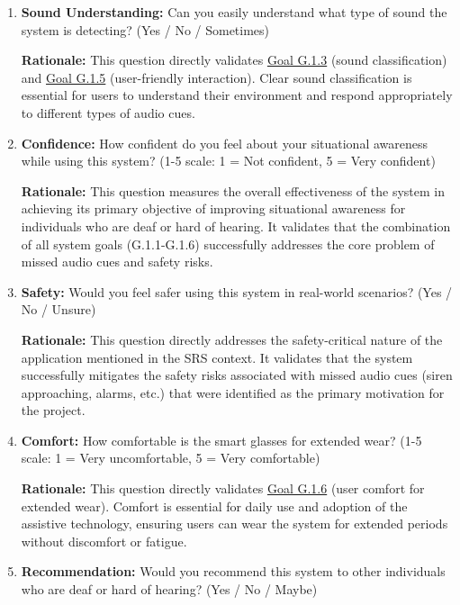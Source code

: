 \documentclass[12pt, titlepage]{article}
\begin{document}
\begin{enumerate}
    \item \textbf{Sound Understanding:} Can you easily understand what type of
    sound the system is detecting? (Yes / No / Sometimes)
    
    \textbf{Rationale:} This question directly validates
    \hyperref[SRS-goal:audio_identification_analysis]{Goal G.1.3} (sound
    classification) and
    \hyperref[SRS-goal:user_friendly_interaction]{Goal G.1.5}
    (user-friendly interaction). Clear sound classification is essential for
    users to understand their environment and respond appropriately to different
    types of audio cues.
    
    \item \textbf{Confidence:} How confident do you feel about your situational
    awareness while using this system? (1-5 scale: 1 = Not confident, 5 = Very
    confident)
    
    \textbf{Rationale:} This question measures the overall effectiveness of the
    system in achieving its primary objective of improving situational awareness
    for individuals who are deaf or hard of hearing. It validates that the
    combination of all system goals (G.1.1-G.1.6) successfully addresses the
    core problem of missed audio cues and safety risks.
    
    \item \textbf{Safety:} Would you feel safer using this system in real-world
    scenarios? (Yes / No / Unsure)
    
    \textbf{Rationale:} This question directly addresses the safety-critical
    nature of the application mentioned in the SRS context. It validates that
    the system successfully mitigates the safety risks associated with missed
    audio cues (siren approaching, alarms, etc.) that were identified as the
    primary motivation for the project.
    
    \item \textbf{Comfort:} How comfortable is the smart glasses for extended
    wear? (1-5 scale: 1 = Very uncomfortable, 5 = Very comfortable)
    
    \textbf{Rationale:} This question directly validates
    \hyperref[SRS-goal:user_comfort]{Goal G.1.6} (user comfort for extended
    wear).
    Comfort is essential for daily use and adoption of the assistive technology,
    ensuring users can wear the system for extended periods without discomfort
    or fatigue.
    
    \item \textbf{Recommendation:} Would you recommend this system to other
    individuals who are deaf or hard of hearing? (Yes / No / Maybe)
    

\end{enumerate}
\end{document}
